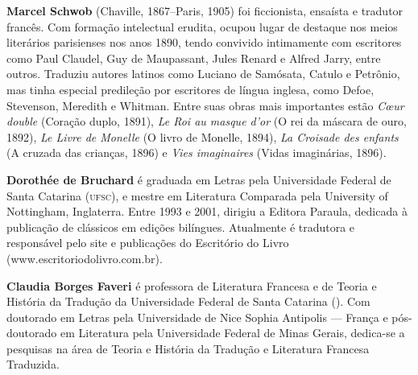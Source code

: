 \textbf{Marcel Schwob} (Chaville, 1867--Paris, 1905) foi ficcionista, ensaísta e tradutor francês. 
Com formação intelectual erudita, ocupou lugar de destaque nos meios literários parisienses
nos anos 1890, tendo convivido intimamente com escritores como Paul Claudel,
Guy de Maupassant, Jules Renard e Alfred Jarry, entre outros. Traduziu autores
latinos como Luciano de Samósata, Catulo e Petrônio, mas tinha especial
predileção por escritores de língua inglesa, como Defoe, Stevenson, Meredith e
Whitman. Entre suas obras mais importantes estão \textit{Cœur double}
(Coração duplo, 1891), \textit{Le Roi au masque d’or} (O rei
da máscara de ouro, 1892), \textit{Le Livre de Monelle} (O livro de
Monelle, 1894), \textit{La Croisade des enfants} (A cruzada das
crianças, 1896) e \textit{Vies imaginaires} (Vidas imaginárias, 1896).

       

\textbf{Dorothée de Bruchard} é graduada em Letras pela Universidade Federal
de Santa Catarina (\textsc{ufsc}), e mestre em Literatura Comparada pela University of
Nottingham, Inglaterra. Entre 1993 e 2001, dirigiu a Editora Paraula, dedicada à
publicação de clássicos em edições bilíngues. Atualmente é tradutora e responsável pelo 
site e publicações do Escritório do Livro (www.escritoriodolivro.com.br).

\textbf{Claudia Borges Faveri} é professora de Literatura Francesa e de Teoria e
História da Tradução da Universidade Federal de Santa Catarina (). Com
doutorado em Letras pela Universidade de Nice Sophia Antipolis --- França e
pós-doutorado em Literatura pela Universidade Federal de Minas Gerais,
dedica-se a pesquisas na área de Teoria e História da Tradução e Literatura
Francesa Traduzida.


